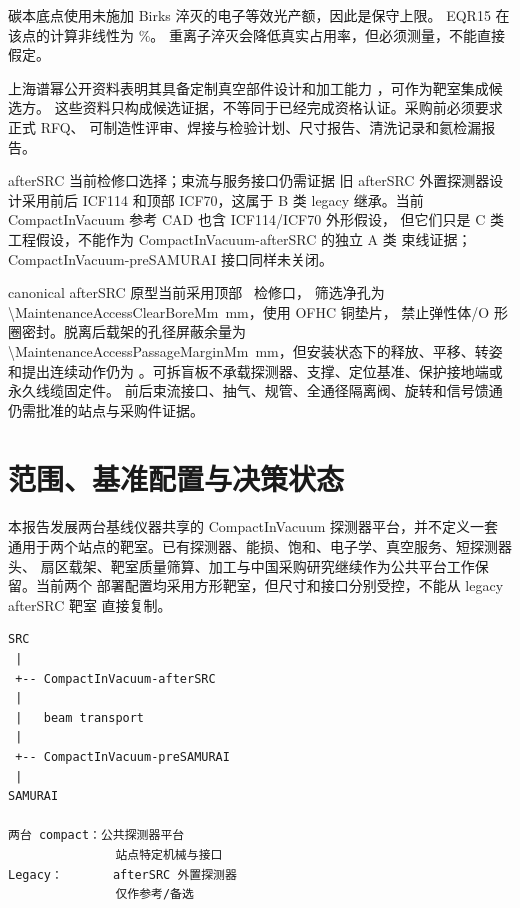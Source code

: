 \documentclass[UTF8,10pt,letterpaper,fontset=none]{ctexart}
\begin{document}
碳本底点使用未施加 Birks 淬灭的电子等效光产额，因此是保守上限。
EQR15 在该点的计算非线性为 \EqrCarbonNonlinearity\%。
重离子淬灭会降低真实占用率，但必须测量，不能直接假定。

上海谱幂公开资料表明其具备定制真空部件设计和加工能力
\cite{prmat_about,prmat_kcell}，可作为靶室集成候选方。
这些资料只构成候选证据，不等同于已经完成资格认证。采购前必须要求正式 RFQ、
可制造性评审、焊接与检验计划、尺寸报告、清洗记录和氦检漏报告。

\begin{warningbox}{afterSRC 当前检修口选择；束流与服务接口仍需证据}
  旧 afterSRC 外置探测器设计采用前后 ICF114 和顶部 ICF70，这属于 B 类
  legacy 继承。当前 CompactInVacuum 参考 CAD 也含 ICF114/ICF70 外形假设，
  但它们只是 C 类工程假设，不能作为 CompactInVacuum-afterSRC 的独立 A 类
  束线证据；CompactInVacuum-preSAMURAI 接口同样未关闭。

  canonical afterSRC 原型当前采用顶部 \MaintenanceAccessStandard\ 检修口，
  筛选净孔为 \SI{\MaintenanceAccessClearBoreMm}{\milli\meter}，使用 OFHC 铜垫片，
  禁止弹性体/O 形圈密封。脱离后载架的孔径屏蔽余量为
  \SI{\MaintenanceAccessPassageMarginMm}{\milli\meter}，但安装状态下的释放、平移、转姿和提出连续动作仍为
  \MaintenanceExtractionStatus。可拆盲板不承载探测器、支撑、定位基准、保护接地端或永久线缆固定件。
  前后束流接口、抽气、规管、全通径隔离阀、旋转和信号馈通仍需批准的站点与采购件证据。
\end{warningbox}

\section{范围、基准配置与决策状态}

本报告发展两台基线仪器共享的 CompactInVacuum 探测器平台，并不定义一套
通用于两个站点的靶室。已有探测器、能损、饱和、电子学、真空服务、短探测器头、
扇区载架、靶室质量筛算、加工与中国采购研究继续作为公共平台工作保留。当前两个
部署配置均采用方形靶室，但尺寸和接口分别受控，不能从 legacy afterSRC 靶室
直接复制。

\begin{center}
\begin{minipage}{0.72\textwidth}
\begin{Verbatim}[fontsize=\small,frame=single]
SRC
 |
 +-- CompactInVacuum-afterSRC
 |
 |   beam transport
 |
 +-- CompactInVacuum-preSAMURAI
 |
SAMURAI

两台 compact：公共探测器平台
               站点特定机械与接口
Legacy：       afterSRC 外置探测器
               仅作参考/备选
\end{Verbatim}
\end{minipage}
\end{center}
\end{document}
